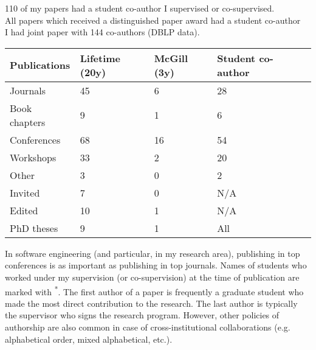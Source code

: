 \documentclass{xetexCV}
\begin{document}
110 of my papers had a student co-author I supervised or co-supervised. \\
All papers which received a distinguished paper award had a student co-author \\
I had joint paper with 144 co-authors (DBLP data). \\

\begin{tabular}{@{}lllll@{}}
\toprule
\textbf{Publications} & \textbf{Lifetime} (20y) & \textbf{McGill} (3y) & \textbf{Student co-author} \\ \midrule
Journals & 45 & 6 & 28 \\ \midrule
Book chapters & 9 & 1 & 6  \\ \midrule
Conferences & 68 & 16 & 54  \\ \midrule
Workshops & 33 & 2 & 20  \\ \midrule
Other & 3 & 0 & 2  \\ \midrule
Invited & 7 & 0 & N/A   \\ \midrule
Edited & 10 & 1 & N/A \\ \midrule
PhD theses &  9 & 1 & All \\ \midrule
\bottomrule
\end{tabular}


In software engineering (and particular, in my research area), publishing in top conferences is as important as publishing in top journals. Names of students who worked under my supervision (or co-supervision) at the time of publication are marked with \textsuperscript{*}. The first author of a paper is frequently a graduate student who made the most direct contribution to the research. The last author is typically the supervisor who signs the research program. However, other policies of authorship are also common in case of cross-institutional collaborations (e.g. alphabetical order, mixed alphabetical, etc.). 



\begin{refsection}
\newrefcontext[labelprefix=B]
  \nocite{fmi2004,nagl65-2010,bpel2sal-sensoria-book,sensoria-uml,SENSORIABook:AdvancesInGT,mdegt2005_ggzvvv,caise2011-revised,fmic2005_pv,fmhe2018}
\printbibliography[title=Books and Book Chapter (Total: 9)]
\end{refsection}
\end{document}
